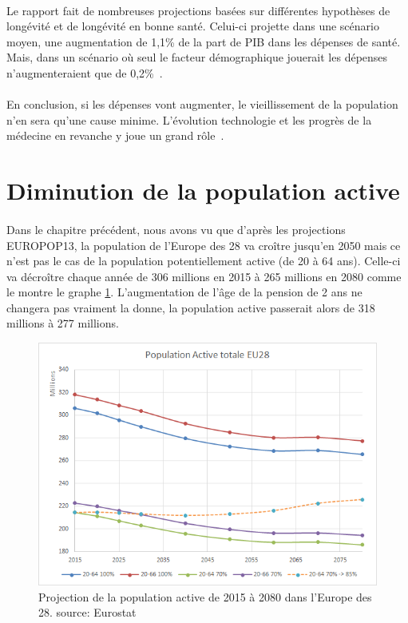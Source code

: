 \paragraph{}Le rapport fait de nombreuses projections basées sur différentes hypothèses de longévité et de longévité en bonne santé.  Celui-ci projette dans une scénario moyen, une augmentation de 1,1\% de la part de PIB dans les dépenses de santé. Mais, dans un scénario où seul le facteur démographique jouerait les dépenses n’augmenteraient que de 0,2\%~\citep[pp.18]{ageing}. 

\paragraph{}En conclusion, si les dépenses vont augmenter, le vieillissement de la population n’en sera qu’une cause minime. L’évolution technologie et les progrès de la médecine en revanche y joue un grand rôle~\citep[pp.120]{ageing}. 

\section{Diminution de la population active}
\paragraph{}Dans le chapitre précédent, nous avons vu que d’après les projections EUROPOP13, la population de l’Europe des 28 va croître jusqu’en 2050 mais ce n’est pas le cas de la population potentiellement active (de 20 à 64 ans). Celle-ci va décroître chaque année de 306 millions en 2015 à 265 millions en 2080 comme le montre le graphe \ref{active}. L’augmentation de l’âge de la pension de 2 ans ne changera pas vraiment la donne, la population active passerait alors de 318 millions à 277 millions. 

\begin{figure}[h!]
    \begin{center}
        \includegraphics[scale=0.7]{document/active.png}
        \caption{Projection de la population active de 2015 à 2080 dans l'Europe des 28. source: Eurostat~\citep{eurostat_europop13}}
        \label{active}
    \end{center}
\end{figure}

